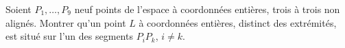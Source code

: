 Soient $P_1, \ldots, P_9$ neuf points de l'espace à coordonnées entières, trois à trois non alignés. Montrer qu'un point $L$ à coordonnées entières, distinct des extrémités, est situé sur l'un des segments $P_iP_k$, $i \neq k$.
